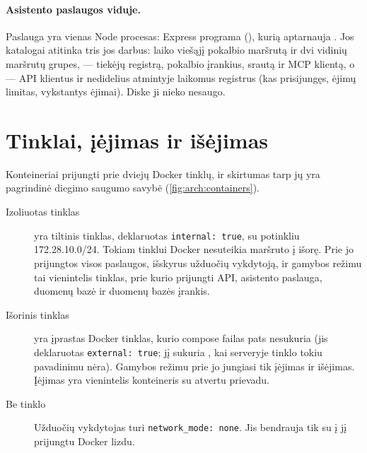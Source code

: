 \paragraph{Asistento paslaugos viduje.} Paslauga yra vienas Node procesas: Express programa
(), kurią aptarnauja . Jos katalogai atitinka tris jos darbus:
 laiko viešąjį pokalbio maršrutą ir dvi vidinių maršrutų grupes,  ---
tiekėjų registrą, pokalbio įrankius, srautą ir MCP klientą, o  --- API
klientus ir nedidelius atmintyje laikomus registrus (kas prisijungęs, ėjimų limitas, vykstantys
ėjimai). Diske ji nieko nesaugo.

\section{Tinklai, įėjimas ir išėjimas}\label{sec:arch:network}

Konteineriai prijungti prie dviejų Docker tinklų, ir skirtumas tarp jų yra pagrindinė
diegimo saugumo savybė (\cref{fig:arch:containers}).

\begin{description}
  \item[Izoliuotas tinklas]  yra tiltinis tinklas, deklaruotas
    \texttt{internal: true}, su potinkliu 172.28.10.0/24. Tokiam tinklui Docker nesuteikia
    maršruto į išorę. Prie jo prijungtos visos paslaugos, išskyrus užduočių vykdytoją, ir
    gamybos režimu tai vienintelis tinklas, prie kurio prijungti API, asistento paslauga,
    duomenų bazė ir duomenų bazės įrankis.
  \item[Išorinis tinklas]  yra įprastas Docker tinklas, kurio compose failas
    pats nesukuria (jis deklaruotas \texttt{external: true}; jį sukuria
    , kai serveryje tinklo tokiu pavadinimu nėra). Gamybos režimu
    prie jo jungiasi tik įėjimas ir išėjimas.
    Įėjimas yra vienintelis konteineris su atvertu prievadu.
  \item[Be tinklo] Užduočių vykdytojas turi \texttt{network\_mode: none}. Jis bendrauja tik su
    į jį prijungtu Docker lizdu.
\end{description}

